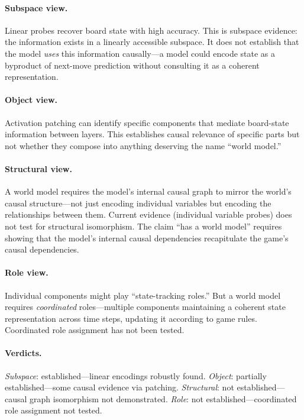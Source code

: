 \documentclass{article}
\begin{document}
\paragraph{Subspace view.}
Linear probes recover board state with high accuracy. This is subspace
evidence: the information exists in a linearly accessible subspace. It
does not establish that the model \emph{uses} this information
causally---a model could encode state as a byproduct of next-move
prediction without consulting it as a coherent representation.

\paragraph{Object view.}
Activation patching can identify specific components that mediate
board-state information between layers. This establishes causal relevance
of specific parts but not whether they compose into anything deserving
the name ``world model.''

\paragraph{Structural view.}
A world model requires the model's internal causal graph to mirror the
world's causal structure---not just encoding individual variables but
encoding the relationships between them. Current evidence (individual
variable probes) does not test for structural isomorphism. The claim
``has a world model'' requires showing that the model's internal causal
dependencies recapitulate the game's causal dependencies.

\paragraph{Role view.}
Individual components might play ``state-tracking roles.'' But a world
model requires \emph{coordinated} roles---multiple components maintaining
a coherent state representation across time steps, updating it according
to game rules. Coordinated role assignment has not been tested.

\paragraph{Verdicts.}
\emph{Subspace}: established---linear encodings robustly found.
\emph{Object}: partially established---some causal evidence via
patching.
\emph{Structural}: not established---causal graph isomorphism not
demonstrated.
\emph{Role}: not established---coordinated role assignment not tested.
\end{document}
